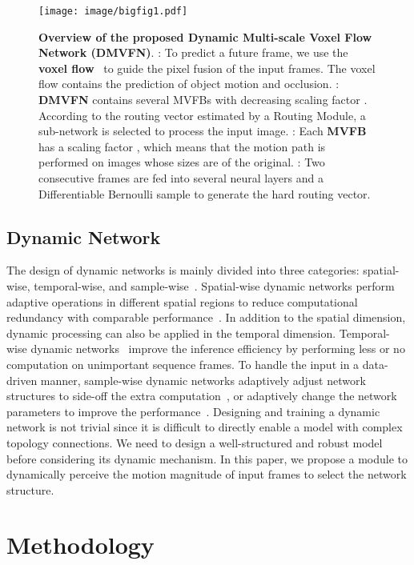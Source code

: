 \documentclass[10pt,twocolumn,letterpaper]{article}
\begin{document}
\begin{figure*}[ht]
	\centering
	\texttt{[image: image/bigfig1.pdf]}
	\caption{\textbf{Overview of the proposed Dynamic Multi-scale Voxel Flow Network (DMVFN)}.
: To predict a future frame, we use the \textbf{voxel flow}~\cite{dvf} to guide the pixel fusion of the input frames. The voxel flow contains the prediction of object motion and occlusion. : \textbf{DMVFN} contains several MVFBs with decreasing scaling factor .
According to the routing vector  estimated by a Routing Module, a sub-network is selected to process the input image. 
: Each \textbf{MVFB} has a scaling factor , which means that the motion path is performed on images whose sizes are  of the original. : Two consecutive frames are fed into several neural layers and a Differentiable Bernoulli sample to generate the hard routing vector.
}
	\label{fig:predict}
\end{figure*}

\subsection{Dynamic Network}
The design of dynamic networks is mainly divided into three categories: spatial-wise, temporal-wise, and sample-wise~\cite{dynamicnn}. Spatial-wise dynamic networks perform adaptive operations in different spatial regions to reduce computational redundancy with comparable performance~\cite{sbnet,dynamicconv,mga}. In addition to the spatial dimension, dynamic processing can also be applied in the temporal dimension. Temporal-wise dynamic networks~\cite{yeung2016end, su2016leaving, wu2019adaframe} improve the inference efficiency by performing less or no computation on unimportant sequence frames.
To handle the input in a data-driven manner, sample-wise dynamic networks adaptively adjust network structures to side-off the extra computation~\cite{skipnet,veit2018convolutional}, or adaptively change the network parameters to improve the performance~\cite{harley2017segmentation,su2019pixel,dcn,dcn2}. Designing and training a dynamic network is not trivial since it is difficult to directly enable a model with complex topology connections. We need to design a well-structured and robust model before considering its dynamic mechanism. In this paper, we propose a module to dynamically perceive the motion magnitude of input frames to select the network structure.
 	


\section{Methodology}
\end{document}
